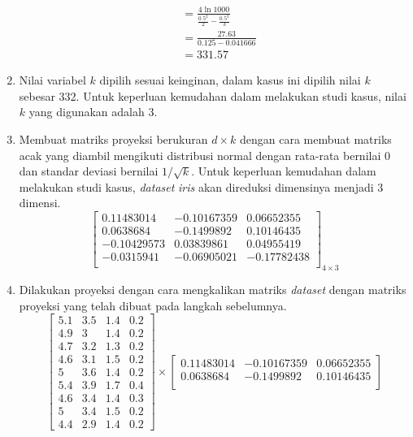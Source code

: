 \begin{enumerate}
\begin{align*}
        &= \frac{4\ln{1000}}{\frac{0.5^{2}}{2}-\frac{0.5^{3}}{3}} \\
        &= \frac{27.63}{0.125-0.041666} \\
        &= 331.57
    \end{align*}
    \item Nilai variabel \(k\) dipilih sesuai keinginan, dalam kasus ini dipilih nilai \(k\) sebesar 332. Untuk keperluan kemudahan dalam melakukan studi kasus, nilai \(k\) yang digunakan adalah 3.
    \item Membuat matriks proyeksi berukuran \(d \times k\) dengan cara membuat matriks acak yang diambil mengikuti distribusi normal dengan rata-rata bernilai 0 dan standar deviasi bernilai \(1/\sqrt{k}\). Untuk keperluan kemudahan dalam melakukan studi kasus, \textit{dataset} \textit{iris} akan direduksi dimensinya menjadi 3 dimensi.
    \[
        \begin{bmatrix}
        0.11483014 &  -0.10167359  &  0.06652355 \\
        0.0638684 &   -0.1499892   &  0.10146435 \\
        -0.10429573 &   0.03839861 &   0.04955419 \\
        -0.0315941  &  -0.06905021  & -0.17782438 \\
        \end{bmatrix}_{4\times 3}
    \]
    \item Dilakukan proyeksi dengan cara mengkalikan matriks \textit{dataset} dengan matriks proyeksi yang telah dibuat pada langkah sebelumnya.
    \[
        \begin{bmatrix}
        5.1		&		3.5		&		1.4		&		0.2	\\
        4.9		&		3		&		1.4		&		0.2	\\
        4.7		&		3.2		&		1.3		&		0.2	\\
        4.6		&		3.1		&		1.5		&		0.2	\\
        5		&		3.6		&		1.4		&		0.2	\\
        5.4		&		3.9		&		1.7		&		0.4	\\
        4.6		&		3.4		&		1.4		&		0.3	\\
        5		&		3.4		&		1.5		&		0.2	\\
        4.4		&		2.9		&		1.4		&		0.2 
        \end{bmatrix}
        \times
        \begin{bmatrix}
        0.11483014 &  -0.10167359  &  0.06652355 \\
        0.0638684 &   -0.1499892   &  0.10146435 \\

\end{bmatrix}\]
\end{enumerate}

